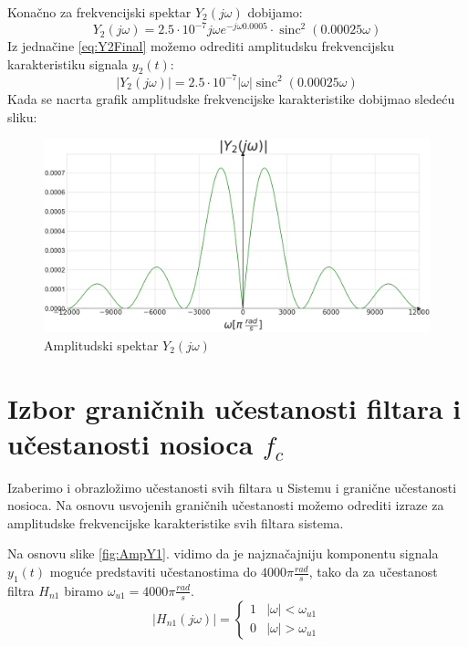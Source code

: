 \documentclass[titlepage,a4paper,12pt]{article}
\DeclareMathOperator{\sinc}{sinc}
\begin{document}
	Konačno za frekvencijski spektar $Y_2(j\omega)$ dobijamo:
	\begin{equation}
		Y_2(j\omega) = 2.5\cdot10^{-7} j\omega e^{-j\omega 0.0005}\cdot\sinc^2(0.00025\omega)\label{eq:Y2Final}
	\end{equation}
	Iz jednačine \eqref{eq:Y2Final} možemo odrediti amplitudsku frekvencijsku karakteristiku signala $y_2(t)$:
	\begin{equation}
		|Y_2(j\omega)|= 2.5\cdot10^{-7}|\omega|\sinc^2(0.00025\omega)\label{eq:Y2FinalABS}
	\end{equation}
	Kada se nacrta grafik amplitudske frekvencijske karakteristike dobijmao sledeću sliku:
	\begin{figure}[ht]
		\centering
		\includegraphics[width=\textwidth]{Images/AmpY2.png}
		\caption{Amplitudski spektar $Y_2(j\omega)$}\label{fig:AmpY2}
	\end{figure}
	\FloatBarrier
	\clearpage
	
	\section{Izbor graničnih učestanosti filtara i učestanosti nosioca $f_c$}
	Izaberimo i obrazložimo učestanosti svih filtara u Sistemu i granične učestanosti nosioca. Na osnovu usvojenih graničnih učestanosti možemo odrediti izraze za amplitudske frekvencijske karakteristike svih filtara sistema.
	\bigskip
	
	Na osnovu slike \ref{fig:AmpY1}. vidimo da je najznačajniju komponentu signala $y_1(t)$ moguće predstaviti učestanostima do $4000\pi \frac{rad}{s}$, tako da za učestanost filtra $H_{n1}$ biramo $\omega_{u1} = 4000\pi \frac{rad}{s}$.
	\begin{equation}
		|H_{n1}(j\omega)| = \left\{
		\begin{array}{ll}
			1& |\omega| < \omega_{u1} \\
			0& |\omega| > \omega_{u1}
		\end{array}\right.
	\end{equation} 
	
\end{document}
